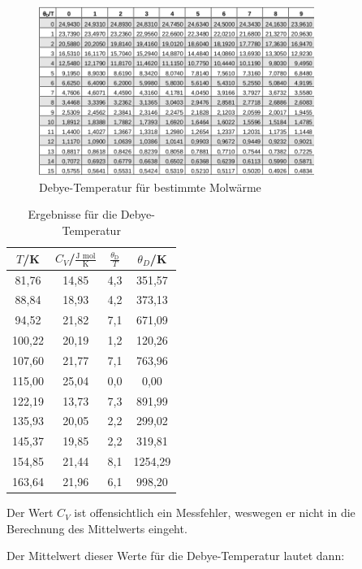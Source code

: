 \begin{figure}
	\centering
		\includegraphics[width=0.8\textwidth]{debye.png}
	\caption{Debye-Temperatur für bestimmte Molwärme \cite{v47}}
	\label{fig:abb3}
\end{figure}

\begin{table}[H]
	\begin{center}
		\begin{tabular}{c c c c}
			\toprule
			\(T\)/K & \(C_V\)/\(\frac{\text{J mol}}{\text{K}}\) & \(\frac{\theta_\text{D}}{T}\) & \(\theta_D\)/K \\
			\midrule
			81,76	&14,85	&4,3		&351,57\\
			88,84	&18,93	&4,2		&373,13\\
			94,52	&21,82	&7,1		&671,09\\
			100,22	&20,19	&1,2		&120,26\\
			107,60	&21,77	&7,1		&763,96\\
			115,00	&25,04	&0,0		&0,00\\
			122,19	&13,73	&7,3		&891,99\\
			135,93	&20,05	&2,2		&299,02\\
			145,37	&19,85	&2,2		&319,81\\
			154,85	&21,44	&8,1		&1254,29\\
			163,64	&21,96	&6,1		&998,20\\
			\bottomrule
		\end{tabular}
		\caption{Ergebnisse für die Debye-Temperatur}
		\label{fig:tab5}
	\end{center}
\end{table}

\noindent Der Wert \(C_V\) ist offensichtlich ein Messfehler, weswegen er nicht in die Berechnung des Mittelwerts eingeht.

\noindent Der Mittelwert dieser Werte für die Debye-Temperatur lautet dann:

